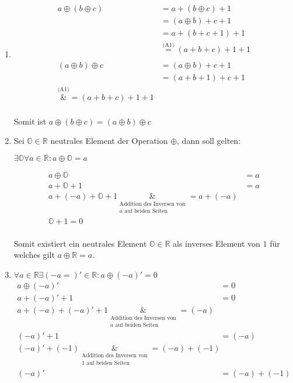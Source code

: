 \documentclass{article}
\begin{document}
\begin{enumerate}[label=(A\arabic*)]
\item
  \begin{align*}
    a \oplus (b \oplus c) &= a + (b \oplus c) + 1 \\
                          &= (a \oplus b) + c + 1 \\
                          &= a + (b + c + 1) + 1 \\
                          &\overset{\text{(A1)}}= (a + b + c) + 1 + 1 \\
    \\
    (a \oplus b) \oplus c &= (a \oplus b) + c + 1 \\
                          &= (a + b + 1) + c + 1 \\
    \overset{\text{(A1)}}&{=} (a + b + c) + 1 + 1 \\
  \end{align*}

  Somit ist $a \oplus (b \oplus c) = (a \oplus b) \oplus c$

\item Sei $\mathbb{O} \in \mathbb{R}$ neutrales Element der Operation $\oplus$, dann soll gelten:

  $\exists \mathbb{O} \forall a \in \mathbb{R} \colon a \oplus \mathbb{O} = a$

  \begin{align*}
    a \oplus \mathbb{O} &= a \\
    a + \mathbb{O} + 1 &= a\\
    a + (-a) + \mathbb{O} + 1 \underset{\substack{\text{Addition des Inversen von} \\ a \text{ auf beiden Seiten}}}&{=} a + (-a) \\
    \mathbb{O} + 1 = 0 \\
  \end{align*}

  Somit existiert ein neutrales Element $\mathbb{O} \in \mathbb{R}$ als inverses Element von $1$ für welches gilt
  $a \oplus \mathbb{R} = a$.

\item $\forall a \in \mathbb{R} \exists (-a=)' \in \mathbb{R} \colon a \oplus (-a)' = 0$ \\

  \begin{align*}
    a \oplus (-a)' &= 0 \\
    a + (-a)' + 1 &= 0 \\ 
    a + (-a) + (-a)' + 1 \underset{\substack{\text{Addition des Inversen von} \\ a \text{ auf beiden Seiten}}}&{=} (-a)\\
    (-a)' + 1 &= (-a) \\
    (-a)' + (-1) \underset{\substack{\text{Addition des Inversen von} \\ 1 \text{ auf beiden Seiten}}}&{=} (-a) + (-1)\\
    (-a)' &= (-a) + (-1) \\
  \end{align*}


\end{enumerate}
\end{document}
